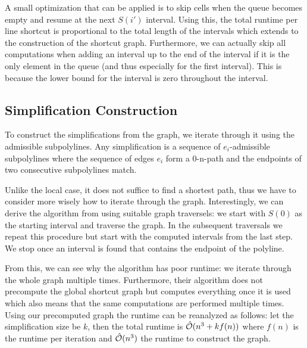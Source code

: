 A small optimization that can be applied is to skip cells when the queue becomes empty and resume at the next \(S(i')\) interval. Using this, the total runtime per line shortcut is proportional to the total length of the intervals which extends to the construction of the shortcut graph. Furthermore, we can actually skip all computations when adding an interval up to the end of the interval if it is the only element in the queue (and thus especially for the first interval). This is because the lower bound for the interval is zero throughout the interval.

\subsection{Simplification Construction}

To construct the simplifications from the graph, we iterate through it using the admissible subpolylines. Any simplification is a sequence of \(e_i\)-admissible subpolylines where the sequence of edges \(e_i\) form a 0-n-path and the endpoints of two consecutive subpolylines match.

Unlike the local case, it does not suffice to find a shortest path, thus we have to consider more wisely how to iterate through the graph. Interestingly, we can derive the algorithm from \citeauthor{on_optimal_polyline_simplification_using_the_hausdorff_and_frechet_distance} using suitable graph traversels: we start with \(S(0)\) as the starting interval and traverse the graph. In the subsequent traversals we repeat this procedure but start with the computed intervals from the last step. We stop once an interval is found that contains the endpoint of the polyline.

From this, we can see why the \citeauthor{on_optimal_polyline_simplification_using_the_hausdorff_and_frechet_distance} algorithm has poor runtime: we iterate through the whole graph multiple times. Furthermore, their algorithm does not precompute the global shortcut graph but computes everything once it is used which also means that the same computations are performed multiple times. Using our precomputed graph the runtime can be reanalyzed as follows: let the simplification size be \(k\), then the total runtime is \(\hat{\mathcal{O}}(n^3 + kf(n))\) where \(f(n)\) is the runtime per iteration and \(\hat{\mathcal{O}}(n^3)\) the runtime to construct the graph.

